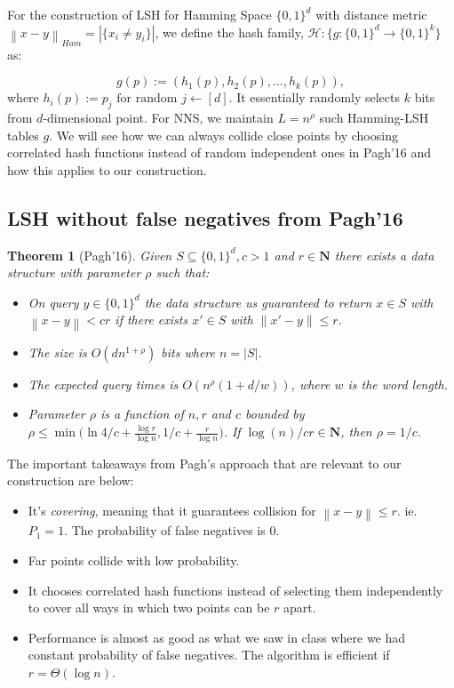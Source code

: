 \documentclass{scrartcl}
\newtheorem*{theorem*}{Theorem}
\newcommand{\norm}[1]{\left\lVert#1\right\rVert}
\begin{document}
For the construction of LSH for Hamming Space $\{0,1\}^d$ with distance metric $\norm{x-y}_{Ham}=|\{x_i\neq y_i\}|$, we define the hash family, $\mathcal{H} : \{g:\{0,1\}^d \to \{0,1\}^k\}$ as:

\[ g(p) := (h_1(p), h_2(p), \ldots, h_k(p)),\]
where $h_i(p):= p_j \mbox{ for random } j \leftarrow [d]$. It essentially randomly selects $k$ bits from $d$-dimensional point. For NNS, we maintain $L = n^\rho$ such Hamming-LSH tables $g$. We will see how we can always collide close points by choosing correlated hash functions instead of random independent ones in Pagh'16 and how this applies to our construction.

\subsection{LSH without false negatives from Pagh'16}
\begin{theorem*}
[Pagh'16] Given $S \subseteq \{0,1\}^d, c>1$ and $r \in \mathbf{N}$ there exists a data structure with parameter $\rho$ such that:
\begin{itemize}
	\item On query $y \in \{0,1\}^d$ the data structure us guaranteed to return $x \in S$ with $\norm{x-y} < cr$ if there exists $x' \in S$ with $\norm{x'-y} \leq r$.
	\item The size is $O(dn^{1+\rho})$ bits where $n = |S|$.
	\item The expected query times is $O(n^\rho(1+d/w))$, where $w$ is the word length.
	\item Parameter $\rho$ is a function of $n, r$ and $c$ bounded by $\rho \leq \min{\Big(\ln{4}/c + \frac{\log{r}}{\log{n}}, 1/c + \frac{r}{\log{n}}\Big)}$. If $\log{(n)}/cr \in \mathbf{N}$, then $\rho = 1/c$.
\end{itemize}
\end{theorem*}

The important takeaways from Pagh's approach that are relevant to our construction are below:
\begin{itemize}
    \item It's \textit{covering}, meaning that it guarantees collision for $\norm{x-y} \leq r$. ie. $P_1 = 1$. The probability of false negatives is 0.
    \item Far points collide with low probability.
    \item It chooses correlated hash functions instead of selecting them independently to cover all ways in which two points can be $r$ apart.
    \item Performance is almost as good as what we saw in class where we had constant probability of false negatives. The algorithm is efficient if $r = \Theta(\log{n})$.
\end{itemize}
\end{document}
